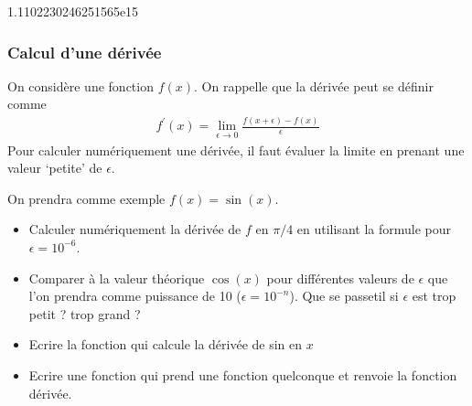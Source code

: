 \documentclass[letterpaper,10pt,english]{sphinxhowto}
\begin{document}
\begin{sphinxVerbatim}[commandchars=\\\{\}]
\end{sphinxVerbatim}

\begin{sphinxVerbatim}[commandchars=\\\{\}]
1.1102230246251565e\PYGZhy{}15
\end{sphinxVerbatim}


\subsubsection{Calcul d’une dérivée}
\label{\detokenize{cours2_nombres_corr_exercices:calcul-d-une-derivee}}
\sphinxAtStartPar
On considère une fonction \(f(x)\). On rappelle que la dérivée peut se définir comme
\begin{equation*}
\begin{split}
f^\prime(x) = \lim_{\epsilon\rightarrow0}\frac{f(x+\epsilon) - f(x)}{\epsilon}
\end{split}
\end{equation*}
\sphinxAtStartPar
Pour calculer numériquement une dérivée, il faut évaluer la limite en prenant une valeur ‘petite’ de \(\epsilon\).

\sphinxAtStartPar
On prendra comme exemple \(f(x) = \sin(x)\).
\begin{itemize}
\item {} 
\sphinxAtStartPar
Calculer numériquement la dérivée de \(f\) en \(\pi/4\) en utilisant la formule pour \(\epsilon = 10^{-6}\).

\item {} 
\sphinxAtStartPar
Comparer à la valeur théorique \(\cos(x)\) pour différentes valeurs de \(\epsilon\) que l’on prendra comme puissance de 10 (\(\epsilon = 10^{-n}\)). Que se passe\sphinxhyphen{}t\sphinxhyphen{}il si \(\epsilon\) est trop petit ? trop grand ?

\item {} 
\sphinxAtStartPar
Ecrire la fonction  qui calcule la dérivée de sin en \(x\)

\item {} 
\sphinxAtStartPar
Ecrire une fonction qui prend une fonction quelconque et renvoie la fonction dérivée.

\end{itemize}
\end{document}
